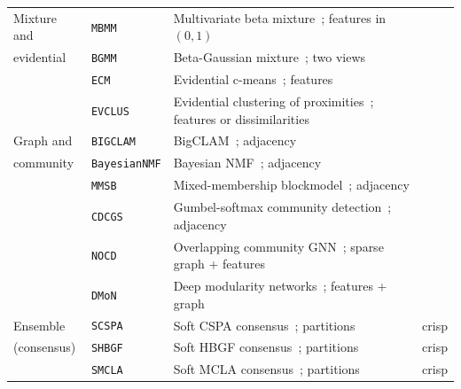 \documentclass[twoside,11pt]{article}
\newcommand{\cmark}{\textcolor{green!70!black}{\ding{51}}}
\newcommand{\xmark}{\textcolor{red!75!black}{\ding{55}}}
\begin{document}
\begin{table}[ht]
\begin{tabular}{p{2.6cm} p{3.4cm} p{4.4cm} c}
Mixture and
& \texttt{MBMM} & Multivariate beta mixture~\cite{hsu2024multivariate}; features in $(0,1)$ & \cmark \\
evidential
& \texttt{BGMM} & Beta-Gaussian mixture~\cite{dai2008bgmm}; two views & \cmark \\
& \texttt{ECM} & Evidential c-means~\cite{masson2008ecm}; features & \cmark \\
& \texttt{EVCLUS} & Evidential clustering of proximities~\cite{denoeux2004evclus}; features or dissimilarities & \cmark \\

\rowcolor{gray!10}
Graph and
& \texttt{BIGCLAM} & BigCLAM~\cite{yang2013overlapping}; adjacency & \xmark \\
\rowcolor{gray!10}
community
& \texttt{BayesianNMF} & Bayesian NMF~\cite{psorakis2011overlapping}; adjacency & \xmark \\
\rowcolor{gray!10}
& \texttt{MMSB} & Mixed-membership blockmodel~\cite{airoldi2008mixed}; adjacency & \cmark \\
\rowcolor{gray!10}
& \texttt{CDCGS} & Gumbel-softmax community detection~\cite{acharya2020community,jang2017categorical}; adjacency & \cmark \\
\rowcolor{gray!10}
& \texttt{NOCD} & Overlapping community GNN~\cite{shchur2019overlapping}; sparse graph + features & \xmark \\
\rowcolor{gray!10}
& \texttt{DMoN} & Deep modularity networks~\cite{tsitsulin2023graph}; features + graph & \cmark \\

Ensemble
& \texttt{SCSPA} & Soft CSPA consensus~\cite{punera2008consensus}; partitions & crisp \\
(consensus)
& \texttt{SHBGF} & Soft HBGF consensus~\cite{punera2008consensus}; partitions & crisp \\
& \texttt{SMCLA} & Soft MCLA consensus~\cite{punera2008consensus}; partitions & crisp \\


\end{tabular}
\end{table}
\end{document}
